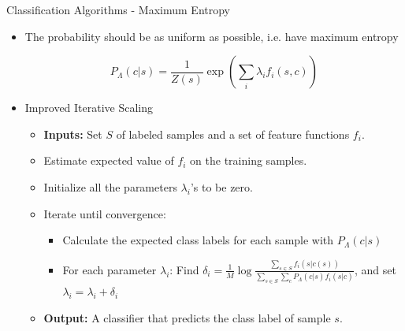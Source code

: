 \documentclass{beamer}
\begin{document}

\begin{frame}{Classification Algorithms - Maximum Entropy}

\begin{itemize}
 \item The probability should be as uniform as possible, i.e. have maximum entropy

\begin{equation}
\label{mx:expdistr}
P_{\Lambda}(c|s) = \frac{1}{Z(s)} \exp (\sum_{i}\lambda_i f_i(s,c))
\end{equation}

 \item Improved Iterative Scaling

\begin{itemize}
	\item \textbf{Inputs:} Set $S$ of labeled samples and a set of feature functions $f_i$.
	\item Estimate expected value of $f_i$ on the training samples.
	\item Initialize all the parameters $\lambda_i$'s to be zero.
	\item Iterate until convergence:
	\begin{itemize}
		\item Calculate the expected class labels for each sample with $P_{\Lambda}(c|s)$
		\item For each parameter $\lambda_i$: Find $\delta_i  = \frac{1}{M} \log \frac{\sum_{s \in S} f_i (s|c(s))}{\sum_{s \in S}\sum_{c} P_{\Lambda}(c|s) f_i(s|c) }$, and set $\lambda_i = \lambda_i + \delta_i$
	\end{itemize}		
	\item \textbf{Output:} A classifier that predicts the class label of sample  $s$.
\end{itemize}

\end{itemize}

\end{frame}

\end{document}
